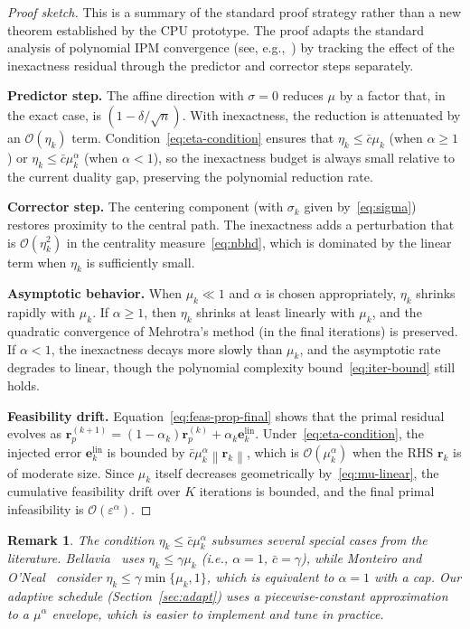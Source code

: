 \documentclass[11pt,twoside]{article}
\newtheorem{remark}{Remark}[section]
\newcommand{\be}{\mathbf{e}}
\newcommand{\br}{\mathbf{r}}
\newcommand{\cO}{\mathcal{O}}
\newcommand{\norm}[1]{\left\lVert#1\right\rVert}
\begin{document}
\begin{proof}[Proof sketch]
  This is a summary of the standard proof strategy rather than a new
  theorem established by the CPU prototype.  The proof adapts the standard
  analysis of polynomial IPM convergence
  (see, e.g.,~\cite{Wright1997, Nesterov1994}) by tracking the effect of
  the inexactness residual through the predictor and corrector steps
  separately.

  \textbf{Predictor step.}  The affine direction with $\sigma=0$ reduces
  $\mu$ by a factor that, in the exact case, is $(1 - \delta/\sqrt{n})$.
  With inexactness, the reduction is attenuated by an $\cO(\eta_k)$ term.
  Condition~\eqref{eq:eta-condition} ensures that $\eta_k \le \bar{c}\mu_k$
  (when $\alpha \ge 1$) or $\eta_k \le \bar{c}\mu_k^\alpha$ (when
  $\alpha < 1$), so the inexactness budget is always small relative to the
  current duality gap, preserving the polynomial reduction rate.

  \textbf{Corrector step.}  The centering component (with $\sigma_k$ given
  by~\eqref{eq:sigma}) restores proximity to the central path.  The
  inexactness adds a perturbation that is $\cO(\eta_k^2)$ in the centrality
  measure~\eqref{eq:nbhd}, which is dominated by the linear term when
  $\eta_k$ is sufficiently small.

  \textbf{Asymptotic behavior.}  When $\mu_k \ll 1$ and $\alpha$ is chosen
  appropriately, $\eta_k$ shrinks rapidly with $\mu_k$.  If
  $\alpha \ge 1$, then $\eta_k$ shrinks at least linearly with $\mu_k$,
  and the quadratic convergence of Mehrotra's method (in the final
  iterations) is preserved.  If $\alpha < 1$, the inexactness decays more
  slowly than $\mu_k$, and the asymptotic rate degrades to linear, though
  the polynomial complexity bound~\eqref{eq:iter-bound} still holds.

  \textbf{Feasibility drift.}  Equation~\eqref{eq:feas-prop-final} shows
  that the primal residual evolves as $\br_p^{(k+1)} = (1-\alpha_k)\br_p^{(k)}
  + \alpha_k \be_k^{\text{lin}}$.  Under~\eqref{eq:eta-condition}, the
  injected error $\be_k^{\text{lin}}$ is bounded by
  $\bar{c}\mu_k^\alpha\norm{\br_k}$, which is $\cO(\mu_k^\alpha)$ when the
  RHS $\br_k$ is of moderate size.  Since $\mu_k$ itself decreases
  geometrically by~\eqref{eq:mu-linear}, the cumulative feasibility drift
  over $K$ iterations is bounded, and the final primal infeasibility is
  $\cO(\varepsilon^\alpha)$.
\end{proof}

\begin{remark}
  The condition $\eta_k \le \bar{c}\mu_k^\alpha$ subsumes several special
  cases from the literature.  Bellavia~\cite{Bellavia1998} uses
  $\eta_k \le \gamma\mu_k$ (i.e., $\alpha=1$, $\bar{c}=\gamma$), while
  Monteiro and O'Neal~\cite{Monteiro2003} consider $\eta_k \le
  \gamma\min\{\mu_k,1\}$, which is equivalent to $\alpha=1$ with a cap.
  Our adaptive schedule (Section~\ref{sec:adapt}) uses a piecewise-constant
  approximation to a $\mu^\alpha$ envelope, which is easier to implement
  and tune in practice.
\end{remark}
\end{document}
